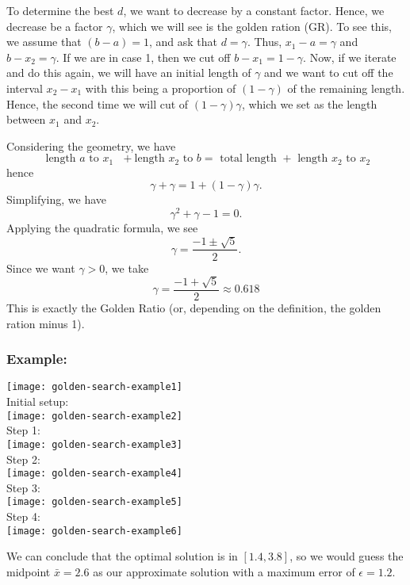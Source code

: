\documentclass[../open-optimization/open-optimization.tex]{subfiles}
\begin{document}
To determine the best $d$, we want to decrease by a constant factor.  Hence, we decrease be a factor $\gamma$, which we will see is the golden ration (GR).  To see this, we assume that $(b-a) = 1$, and ask that $d = \gamma$.  Thus, $x_1 - a = \gamma$ and $b - x_2 = \gamma$.  If we are in case 1, then we cut off $b-x_1 = 1-\gamma$.  Now, if we iterate and do this again, we will have an initial length of $\gamma$ and we want to cut off the interval $x_2 - x_1$ with this being a proportion of $(1-\gamma)$ of the remaining length.  Hence, the second time we will cut of $(1-\gamma)\gamma$, which we set as the length between $x_1$ and $x_2$.  

Considering the geometry, we have
$$
\text{ length $a$ to $x_1$ } + \text{length $x_2$ to $b$} = \text{ total length } + \text{ length $x_2$ to $x_2$}
$$ 
hence
$$
\gamma + \gamma = 1 + (1-\gamma)\gamma.
$$
Simplifying, we have
$$
\gamma^2 + \gamma - 1 = 0.
$$
Applying the quadratic formula, we see
$$
\gamma = \frac{-1 \pm \sqrt{5}}{2}.
$$
Since we want $\gamma > 0$, we take 
$$
\gamma = \frac{-1 + \sqrt{5}}{2} \approx 0.618
$$
This is exactly the Golden Ratio (or, depending on the definition, the golden ration minus 1).



\subsubsection{Example:}

\begin{center}
\texttt{[image: golden-search-example1]}\\
Initial setup:\\
\texttt{[image: golden-search-example2]}\\
Step 1:\\
\texttt{[image: golden-search-example3]}\\
Step 2:\\
\texttt{[image: golden-search-example4]}\\
Step 3:\\
\texttt{[image: golden-search-example5]}\\
Step 4:\\
\texttt{[image: golden-search-example6]}
\end{center}
We can conclude that the optimal solution is in $[1.4,3.8]$, so we would guess the midpoint $\bar x = 2.6$ as our approximate solution with a maximum error of $\epsilon = 1.2$.
\end{document}
